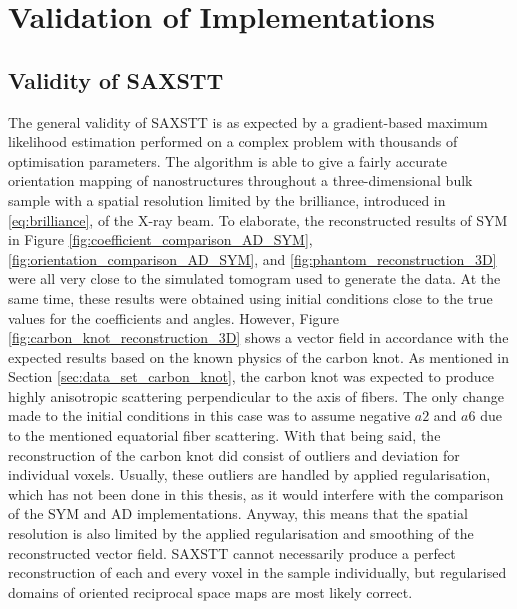\chapter{Validation of Implementations} \label{ch:validation_discussion}

\section{Validity of SAXSTT}\label{sec:validity_saxstt}
The general validity of SAXSTT is as expected by a gradient-based maximum likelihood estimation performed on a complex problem with thousands of optimisation parameters.
The algorithm is able to give a fairly accurate orientation mapping of nanostructures
throughout a three-dimensional bulk sample with a spatial resolution limited by the brilliance, introduced in \eqref{eq:brilliance}, of the X-ray beam.
To elaborate, the reconstructed results of SYM in
Figure \ref{fig:coefficient_comparison_AD_SYM},
\ref{fig:orientation_comparison_AD_SYM}, and
\ref{fig:phantom_reconstruction_3D} were all very close to the simulated tomogram used to generate the data.
At the same time, these results were obtained using initial conditions close to the true values for the coefficients and angles.
However, Figure \ref{fig:carbon_knot_reconstruction_3D} shows a vector field in accordance with the expected results based on the known physics of the carbon knot.
As mentioned in Section \ref{sec:data_set_carbon_knot}, the carbon knot was expected to produce highly anisotropic scattering perpendicular to the axis of fibers.
The only change made to the initial conditions in this case was to assume negative $a2$ and $a6$ due to the mentioned equatorial fiber scattering.
With that being said, the reconstruction of the carbon knot did consist of outliers and deviation for individual voxels.
Usually, these outliers are handled by applied regularisation, which has not been done in this thesis, as it would interfere with the comparison of the SYM and AD implementations.
Anyway, this means that the spatial resolution is also limited by the applied regularisation and smoothing of the reconstructed vector field.
SAXSTT cannot necessarily produce a perfect reconstruction of each and every voxel in the sample individually,
but regularised domains of oriented reciprocal space maps are most likely correct.





